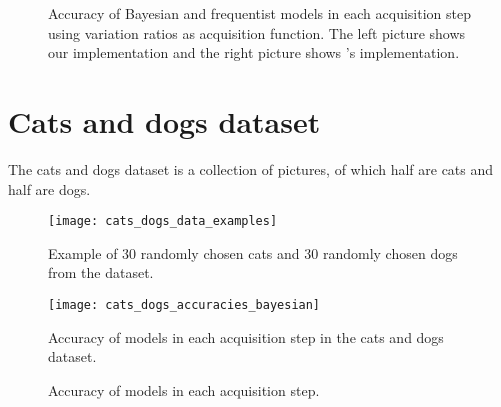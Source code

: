 \begin{figure}[H]
  \centering
  \hfill
  \caption{Accuracy of Bayesian and frequentist models in each acquisition step using variation ratios as acquisition function. The left picture shows our implementation and the right picture shows \citeauthor{Gal2016Active}'s implementation.}
  \label{fig:mnist_var_ratios_AL}
\end{figure}


\section{Cats and dogs dataset}

The cats and dogs dataset is a collection of  pictures, of which half are cats and half are dogs.


\begin{figure}[H]
    \centering
    \texttt{[image: cats\_dogs\_data\_examples]}
    \caption{Example of 30 randomly chosen cats and 30 randomly chosen dogs from the dataset.}
    \label{fig:cats_dogs_data_examples}
\end{figure}


\begin{figure}[H]
    \centering
    \texttt{[image: cats\_dogs\_accuracies\_bayesian]}
    \caption{Accuracy of models in each acquisition step in the cats and dogs dataset.}
    \label{fig:cats_dogs_accuracies_bayesian}
\end{figure}



\begin{figure}[H]
    \centering
    \hfill
    \caption{Accuracy of models in each acquisition step.}
    \label{fig:cats_dogs_bayesian_vs_freq}
\end{figure}

%
%
%

